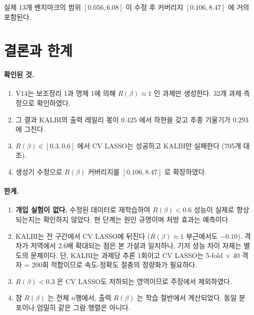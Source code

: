 \documentclass[11pt]{article}
\newcommand{\Rq}{R(\beta)}
\begin{document}
실제 13개 벤치마크의 범위 $[0.056, 6.08]$ 이
수정 후 커버리지 $[0.106, 8.47]$ 에 거의 포함된다.

\section{결론과 한계}

\paragraph{확인된 것.}
\begin{enumerate}
\itemsep2pt
\item V14는 보조정리 1과 명제 1에 의해 $\Rq \approx 1$ 인 과제만 생성한다.
      32개 과제 측정으로 확인하였다.
\item 그 결과 KALBI의 출력 레일리 몫이 $0.425$ 에서 하한을 갖고
      추종 기울기가 $0.293$ 에 그친다.
\item $\Rq \in [0.3, 0.6]$ 에서 CV LASSO는 성공하고 KALBI만 실패한다
      (705개 대조).
\item 생성기 수정으로 $\Rq$ 커버리지를 $[0.106, 8.47]$ 로 확장하였다.
\end{enumerate}

\paragraph{한계.}
\begin{enumerate}
\itemsep2pt
\item \textbf{개입 실험이 없다.} 수정된 데이터로 재학습하여
      $\Rq < 0.6$ 성능이 실제로 향상되는지는 확인하지 않았다.
      현 단계는 원인 규명이며 처방 효과는 예측이다.
\item KALBI는 전 구간에서 CV LASSO에 뒤진다
      ($\Rq \approx 1$ 부근에서도 $-0.10$).
      격차가 저역에서 2.6배 확대되는 점은 본 가설과 일치하나,
      기저 성능 차이 자체는 별도의 문제이다.
      단, KALBI는 과제당 추론 1회이고 CV LASSO는
      5-fold $\times$ 40 격자 = 200회 적합이므로
      속도-정확도 절충의 정량화가 필요하다.
\item $\Rq < 0.3$ 은 CV LASSO도 저하되는 영역이므로 주장에서 제외하였다.
\item 참 $\Rq$ 는 전체 $n$행에서, 출력 $\Rq$ 는 학습 절반에서 계산되었다.
      동일 분포이나 엄밀히 같은 그람 행렬은 아니다.
\end{enumerate}
\end{document}
